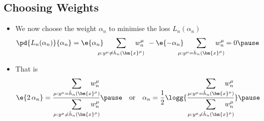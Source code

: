 \begin{slide}
\section{Choosing Weights}

\begin{PauseHighLight}
  \begin{itemize}
  \item We now choose the weight $\alpha_n$ to minimise the loss $L_n(\alpha_n)$
    \begin{align*}
      \pd{L_n(\alpha_n)}{\alpha_n} = 
       \e{\alpha_n} \hspace{-1em} \sum_{\mu:y^\mu\neq
      \hat{h}_n(\bm{x}^\mu)} \hspace{-1.5em}  w_n^\mu\, \;- 
      \e{-\alpha_n} \hspace{-1em} \sum_{\mu:y^\mu= \hat{h}_n(\bm{x}^\mu)}
      \hspace{-1.5em} w_n^\mu =0\pause
    \end{align*}
  \item That is
    \begin{align*}
      \e{2\,\alpha_n} &= \frac{\displaystyle \sum_{\mu:y^\mu=
      \hat{h}_n(\bm{x}^\mu)} \hspace{-1.5em} w_n^\mu}{\displaystyle
                        \sum_{\mu:y^\mu\neq \hat{h}_n(\bm{x}^\mu)} \hspace{-1.5em} w_n^\mu}\pause
                        & \text{or}& &
     \alpha_n &= \frac{1}{2} \logg{\frac{\displaystyle \sum_{\mu:y^\mu=
      \hat{h}_n(\bm{x}^\mu)} \hspace{-1.5em} w_n^\mu}{\displaystyle
                \sum_{\mu:y^\mu\neq \hat{h}_n(\bm{x}^\mu)}\hspace{-1.5em} w_n^\mu}}\pause
    \end{align*}
  \end{itemize}
\end{PauseHighLight}

\end{slide}



